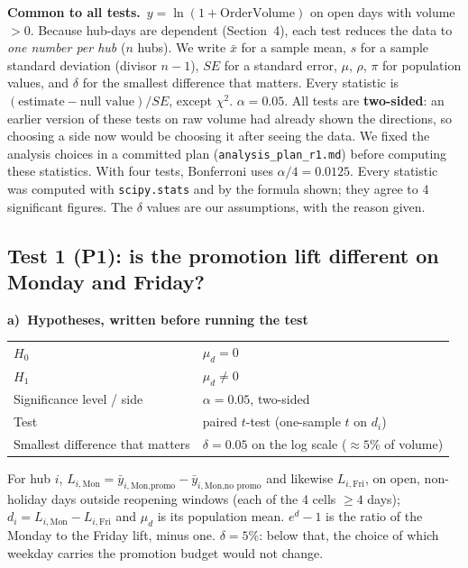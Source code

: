 \documentclass[10pt,a4paper,twocolumn]{article}
\newcommand{\field}[2]{\textbf{#1}~#2\par}
\newcommand{\tpart}[2]{\par\needspace{12\baselineskip}\smallskip\textbf{#1)~#2}\par}
\newcommand{\code}[1]{\texttt{#1}}
\begin{document}
\field{Common to all tests.}{$y=\ln(1+\text{OrderVolume})$ on open days with volume $>0$. Because hub-days are
dependent (Section~4), each test reduces the data to \emph{one number per hub} ($n$ hubs). We write $\bar x$ for a
sample mean, $s$ for a sample standard deviation (divisor $n-1$), $SE$ for a standard error, $\mu$, $\rho$, $\pi$ for
population values, and $\delta$ for the smallest difference that matters. Every statistic is $(\text{estimate}-\text{null
value})/SE$, except $\chi^2$. $\alpha=0.05$. All tests are \textbf{two-sided}: an earlier version of these tests on raw
volume had already shown the directions, so choosing a side now would be choosing it after seeing the data. We fixed the
analysis choices in a committed plan (\code{analysis\_plan\_r1.md}) before computing these statistics. With four tests,
Bonferroni uses $\alpha/4=0.0125$. Every statistic was computed with \code{scipy.stats} and by the formula shown;
they agree to 4 significant figures. The $\delta$ values are our assumptions, with the reason given.}

\subsection*{Test 1 (P1): is the promotion lift different on Monday and Friday?}

\tpart{a}{Hypotheses, written before running the test}
{\small
\begin{tabularx}{\linewidth}{@{}K{3.4cm} Y@{}}
\toprule
$H_0$ & $\mu_d=0$ \\
$H_1$ & $\mu_d\neq0$ \\
Significance level / side & $\alpha=0.05$, two-sided \\
Test & paired $t$-test (one-sample $t$ on $d_i$) \\
Smallest difference that matters & $\delta=0.05$ on the log scale ($\approx5\%$ of volume) \\
\bottomrule
\end{tabularx}}

For hub $i$, $L_{i,\text{Mon}}=\bar y_{i,\text{Mon,promo}}-\bar y_{i,\text{Mon,no promo}}$ and likewise $L_{i,\text{Fri}}$,
on open, non-holiday days outside reopening windows (each of the 4 cells $\ge4$ days); $d_i=L_{i,\text{Mon}}-L_{i,\text{Fri}}$
and $\mu_d$ is its population mean. $e^{d}-1$ is the ratio of the Monday to the Friday lift, minus one. $\delta=5\%$:
below that, the choice of which weekday carries the promotion budget would not change.
\end{document}
